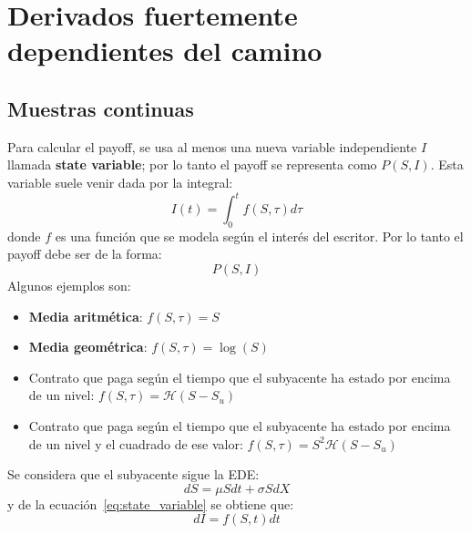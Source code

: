 \section{Derivados fuertemente dependientes del camino}

\subsection{Muestras continuas}
Para calcular el payoff, se usa al menos una nueva variable independiente $I$ llamada \textbf{state variable}; por lo tanto el payoff se representa como $P(S,I)$. Esta variable suele venir dada por la integral:
\begin{equation}\label{eq:state_variable}
    \boxed{I(t) = \int_{0}^{t} f(S, \tau) d\tau}
\end{equation}
donde $f$ es una función que se modela según el interés del escritor. Por lo tanto el payoff debe ser de la forma:
\[
    P(S,I)
\]
Algunos ejemplos son:
\begin{itemize}
    \item \textbf{Media aritmética}: $\boxed{f(S, \tau) = S}$
    \item \textbf{Media geométrica}: $\boxed{f(S, \tau) = \log(S)}$
    \item Contrato que paga según el tiempo que el subyacente ha estado por encima de un nivel: $f(S, \tau) = \mathcal{H}(S-S_u)$
    \item Contrato que paga según el tiempo que el subyacente ha estado por encima de un nivel y el cuadrado de ese valor: $f(S, \tau) = S^2\mathcal{H}(S-S_u)$
\end{itemize}



Se considera que el subyacente sigue la EDE:
\begin{equation*}
    dS = \mu S dt + \sigma S dX
\end{equation*}
y de la ecuación~\eqref{eq:state_variable} se obtiene que:
\begin{equation*}
    dI = f(S, t) dt 
\end{equation*}

